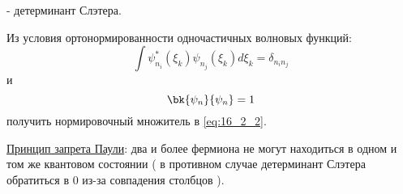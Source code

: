 - детерминант Слэтера.

\begin{excr}
Из условия ортонормированности одночастичных волновых функций: 
$$
\int \psi_{n_i}^*(\xi_k) \psi_{n_j}(\xi_k) d\xi_k = \delta_{n_i n_j}
$$
и 
$$
\bk{\psi_n}{\psi_n} = 1
$$
получить нормировочный множитель в \eqref{eq:16_2_2}.
\end{excr}

\underline{Принцип запрета Паули}: два и более фермиона не могут находиться в одном и том же квантовом состоянии ( в противном случае детерминант Слэтера обратиться в 0 из-за совпадения столбцов ).

